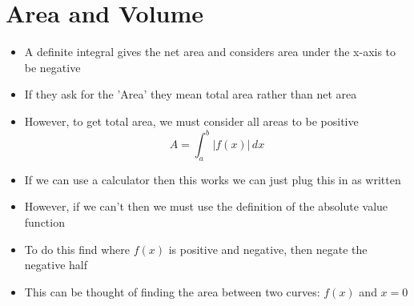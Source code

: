 \documentclass{article}
\begin{document}
\section{Area and Volume}
\begin{itemize}
    \item A definite integral gives the net area and considers area under the x-axis to be negative
    \item If they ask for the 'Area' they mean total area rather than net area
    \item However, to get total area, we must consider all areas to be positive
        \[A=\int_a^b|f(x)|\,dx\]
    \item If we can use a calculator then this works we can just plug this in as written
    \item However, if we can't then we must use the definition of the absolute value function
    \item To do this find where $f(x)$ is positive and negative, then negate the negative half
    \item This can be thought of finding the area between two curves: $f(x)$ and $x=0$
\end{itemize}
\end{document}
